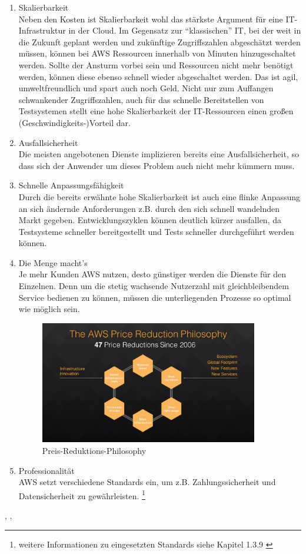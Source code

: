 \begin{enumerate}
  \item Skalierbarkeit
  \\ Neben den Kosten ist Skalierbarkeit wohl das stärkste Argument für eine IT-Infrastruktur in der Cloud. Im Gegensatz zur "`klassischen"' IT, bei der weit in die Zukunft geplant werden und zukünftige Zugriffszahlen abgeschätzt werden müssen, können bei AWS Ressourcen innerhalb von Minuten hinzugeschaltet werden. Sollte der Ansturm vorbei sein und Ressourcen nicht mehr benötigt werden, können diese ebenso schnell wieder abgeschaltet werden. Das ist agil, umweltfreundlich und spart auch noch Geld. Nicht nur zum Auffangen schwankender Zugriffszahlen, auch für das schnelle Bereitstellen von Testsystemen stellt eine hohe Skalierbarkeit der IT-Ressourcen einen großen (Geschwindigkeits-)Vorteil dar.
  \item Ausfallsicherheit
  \\ Die meisten angebotenen Dienste implizieren bereits eine Ausfallsicherheit, so dass sich der Anwender um dieses Problem auch nicht mehr kümmern muss.
  \item Schnelle Anpassungsfähigkeit
  \\ Durch die bereits erwähnte hohe Skalierbarkeit ist auch eine flinke Anpassung an sich ändernde Anforderungen z.B. durch den sich schnell wandelnden Markt gegeben. Entwicklungszyklen können deutlich kürzer ausfallen, da Testsysteme schneller bereitgestellt und Tests schneller durchgeführt werden können.
  \item Die Menge macht's
  \\ Je mehr Kunden AWS nutzen, desto günstiger werden die Dienste für den Einzelnen. Denn um die stetig wachsende Nutzerzahl mit gleichbleibendem Service bedienen zu können, müssen die unterliegenden Prozesse so optimal wie möglich sein.
  \begin{figure}[!ht]
    \centering
    \includegraphics[width=0.9\textwidth]{images/price-reduction.jpg}
    \caption{Preis-Reduktions-Philosophy \cite{aws:insider}}
  \end{figure}
  \item Professionalität
  \\ AWS setzt verschiedene Standards ein, um z.B. Zahlungssicherheit und Datensicherheit zu gewährleisten. \footnote{weitere Informationen zu eingesetzten Standards siehe Kapitel 1.3.9 \cite{wittig:awsinaction}}
\end{enumerate} \cite{aws:insider}, \cite{wittig:awsinaction}, \cite{vliet:programmingec2}


